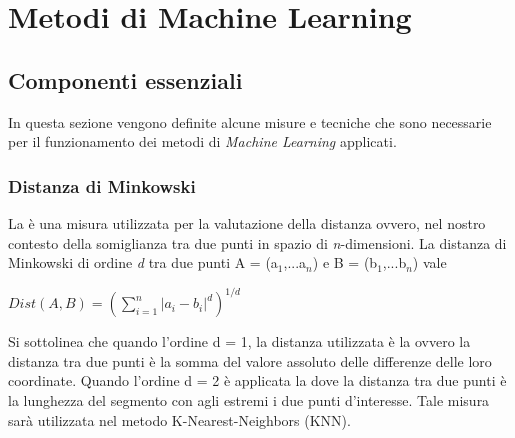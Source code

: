 
\chapter{Metodi di Machine Learning}
\label{cap:ML}
\section{Componenti essenziali}
In questa sezione vengono definite alcune misure e tecniche che sono necessarie per il funzionamento dei metodi di \emph{Machine Learning} applicati.
\subsection{Distanza di Minkowski}
La \textit{\cite{minkdist}} è una misura utilizzata per la valutazione della distanza ovvero, nel nostro contesto della somiglianza tra due punti in spazio di \textit{n}-dimensioni. La distanza di Minkowski di ordine \emph{d} tra due punti A = (a$_1$,...a$_n$) e B = (b$_1$,...b$_n$) vale
\begin{center}
	$Dist(A,B) =  \left(\sum_{i = 1}^{n}|a_i-b_i|^d\right)^{1/d} $
\end{center}

Si sottolinea che quando l'ordine d = 1, la distanza utilizzata è la \textit{\cite{manhattan}} ovvero la distanza tra due punti è la somma del valore assoluto delle differenze delle loro coordinate. Quando l'ordine d = 2 è applicata la \textit{\cite{euclidea}} dove la distanza tra due punti è la lunghezza del segmento con agli estremi i due punti d'interesse.
Tale misura sarà utilizzata nel metodo K-Nearest-Neighbors (KNN).

